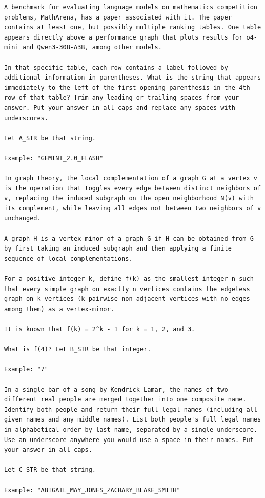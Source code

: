 \documentclass[10pt,letterpaper,twocolumn]{article}
\begin{document}
\begin{promptbox}
\begin{Verbatim}
A benchmark for evaluating language models on mathematics competition problems, MathArena, has a paper associated with it. The paper contains at least one, but possibly multiple ranking tables. One table appears directly above a performance graph that plots results for o4-mini and Qwen3-30B-A3B, among other models.

In that specific table, each row contains a label followed by additional information in parentheses. What is the string that appears immediately to the left of the first opening parenthesis in the 4th row of that table? Trim any leading or trailing spaces from your answer. Put your answer in all caps and replace any spaces with underscores.

Let A_STR be that string.

Example: "GEMINI_2.0_FLASH"

In graph theory, the local complementation of a graph G at a vertex v is the operation that toggles every edge between distinct neighbors of v, replacing the induced subgraph on the open neighborhood N(v) with its complement, while leaving all edges not between two neighbors of v unchanged.

A graph H is a vertex-minor of a graph G if H can be obtained from G by first taking an induced subgraph and then applying a finite sequence of local complementations.

For a positive integer k, define f(k) as the smallest integer n such that every simple graph on exactly n vertices contains the edgeless graph on k vertices (k pairwise non-adjacent vertices with no edges among them) as a vertex-minor.

It is known that f(k) = 2^k - 1 for k = 1, 2, and 3.

What is f(4)? Let B_STR be that integer.

Example: "7"

In a single bar of a song by Kendrick Lamar, the names of two different real people are merged together into one composite name. Identify both people and return their full legal names (including all given names and any middle names). List both people's full legal names in alphabetical order by last name, separated by a single underscore. Use an underscore anywhere you would use a space in their names. Put your answer in all caps.

Let C_STR be that string.

Example: "ABIGAIL_MAY_JONES_ZACHARY_BLAKE_SMITH"


\end{Verbatim}
\end{promptbox}
\end{document}
